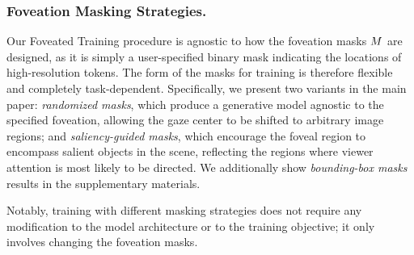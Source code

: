 \subsubsection{Foveation Masking Strategies.} \label{subsub:foveation_mask_stragegy} Our Foveated Training procedure is agnostic to how the foveation masks $M$ are designed, as it is simply a user-specified binary mask indicating the locations of high-resolution tokens. The form of the masks for training is therefore flexible and completely task-dependent. Specifically, we present two variants in the main paper: 
\textit{randomized masks}, which produce a generative model agnostic to the specified foveation, allowing the gaze center to be shifted to arbitrary image regions; and 
\textit{saliency-guided masks}, which encourage the foveal region to encompass salient objects in the scene, reflecting the regions where viewer attention is most likely to be directed. We additionally show \textit{bounding-box masks} results in the supplementary materials.

Notably, training with different masking strategies does not require any modification to the model architecture or to the training objective; it only involves changing the foveation masks.